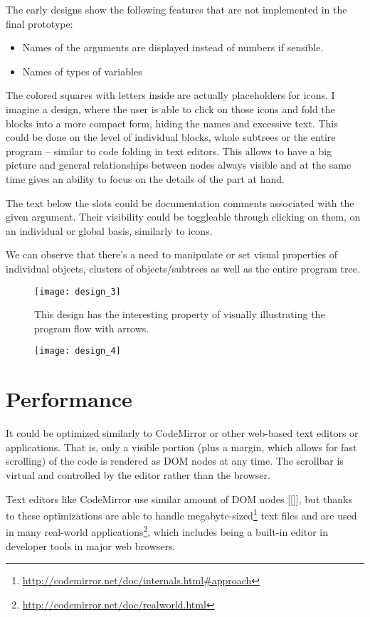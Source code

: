 The early designs show the following features that are not implemented in the final prototype:
\begin{itemize}
	\item Names of the arguments are displayed instead of numbers if sensible.
	\item Names of types of variables
\end{itemize}

The colored squares with letters inside are actually placeholders for icons.
I imagine a design, where the user is able to click on those icons and fold the blocks into a more compact form, hiding the names and excessive text. This could be done on the level of individual blocks, whole subtrees or the entire program -- similar to code folding in text editors. This allows to have a big picture and general relationships between nodes always visible and at the same time gives an ability to focus on the details of the part at hand.

The text below the slots could be documentation comments associated with the given argument. Their visibility could be toggleable through clicking on them, on an individual or global basis, similarly to icons.

We can observe that there's a need to manipulate or set visual properties of individual objects, clusters of objects/subtrees as well as the entire program tree.


\begin{figure}[h!]
\centering
\texttt{[image: design\_3]}
\caption{This design has the interesting property of visually illustrating the program flow with arrows.}
\label{fig:design_3}
\end{figure}


\begin{figure}[h!]
\centering
\texttt{[image: design\_4]}
\caption{}
\label{fig:design_4}
\end{figure}

\section{Performance}
It could be optimized similarly to CodeMirror or other web-based text editors or applications. That is, only a visible portion (plus a margin, which allows for fast scrolling) of the code is rendered as DOM nodes at any time. The scrollbar is virtual and controlled by the editor rather than the browser.

Text editors like CodeMirror use similar amount of DOM nodes [[]], but thanks to these optimizations are able to handle megabyte-sized\footnote{\url{http://codemirror.net/doc/internals.html\#approach}} text files and are used in many real-world applications\footnote{\url{http://codemirror.net/doc/realworld.html}}, which includes being a built-in editor in developer tools in major web browsers.

